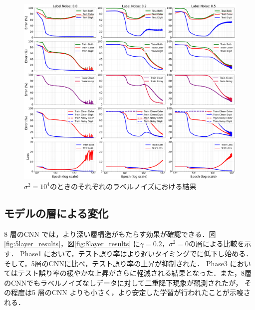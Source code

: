 \begin{figure}[H]
    \centering
    \includegraphics[width=\linewidth]{fig/erroe_metrics_by_variances/error_metrics_by_label_noise_variance_10000.pdf}
    \caption{$\sigma^2 = 10^4$のときのそれぞれのラベルノイズにおける結果}
    \label{fig:errors_by_label_noise_variance_10000}
\end{figure}

\newpage

\subsection{モデルの層による変化}
8 層のCNN では，より深い層構造がもたらす効果が確認できる．図\ref{fig:5layer_results}，図\ref{fig:8layer_results}
に$\gamma = 0.2，\sigma^2 = 0$の層による比較を示す．
Phase1 において，テスト誤り率はより遅いタイミングでに低下し始める．そして，5層のCNNに比べ，テスト誤り率の上昇が抑制された．
Phase3 においてはテスト誤り率の緩やかな上昇がさらに軽減される結果となった．また，8層のCNNでもラベルノイズなしデータに対して二重降下現象が観測されたが，
その程度は5 層のCNN よりも小さく，より安定した学習が行われたことが示唆される．

